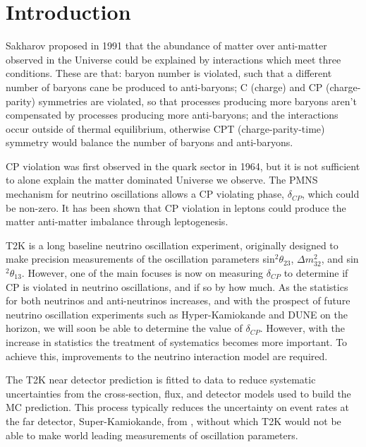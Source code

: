 \chapter{Introduction} \label{sec:introductions}

Sakharov\cite{sakharov} proposed in 1991 that the abundance of matter over anti-matter observed in the Universe could be explained by interactions which meet three conditions. These are that: baryon number is violated, such that a different number of baryons cane be produced to anti-baryons; C (charge) and CP (charge-parity) symmetries are violated, so that processes producing more baryons aren't compensated by processes producing more anti-baryons; and the interactions occur outside of thermal equilibrium, otherwise CPT (charge-parity-time) symmetry would balance the number of baryons and anti-baryons. 

CP violation was first observed in the quark sector in 1964\cite{quarkcpv}, but it is not sufficient to alone explain the matter dominated Universe we observe. The PMNS mechanism for neutrino oscillations allows a CP violating phase, $\delta_{CP}$, which could be non-zero. It has been shown that CP violation in leptons could produce the matter anti-matter imbalance through leptogenesis\cite{leptogenesis}. 

T2K \cite{PhysRevLett.121.171802} is a long baseline neutrino oscillation experiment, originally designed to make precision measurements of the oscillation parameters sin$^2\theta_{23}$, $\Delta m^2_{32}$, and sin$^2\theta_{13}$. However, one of the main focuses is now on measuring $\delta_{CP}$ to determine if CP is violated in neutrino oscillations, and if so by how much. As the statistics for both neutrinos and anti-neutrinos increases, and with the prospect of future neutrino oscillation experiments such as Hyper-Kamiokande \cite{Abe:2018uyc} and DUNE \cite{acciarri2016longbaseline} on the horizon, we will soon be able to determine the value of  $\delta_{CP}$. However, with the increase in statistics the treatment of systematics becomes more important. To achieve this, improvements to the neutrino interaction model are required.

The T2K near detector prediction is fitted to data to reduce systematic uncertainties from the cross-section, flux, and detector models used to build the MC prediction. This process typically reduces the uncertainty on event rates at the far detector, Super-Kamiokande, from , without which T2K would not be able to make world leading measurements of oscillation parameters.

